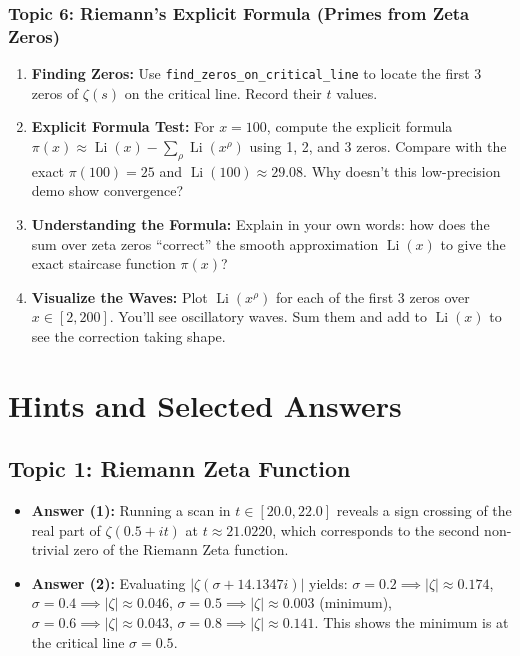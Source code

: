 \documentclass[11pt]{article}
\begin{document}
\subsubsection{Topic 6: Riemann's Explicit Formula (Primes from Zeta Zeros)}
\begin{enumerate}
    \item \textbf{Finding Zeros:} Use \texttt{find\_zeros\_on\_critical\_line} to locate the first 3 zeros of $\zeta(s)$ on the critical line. Record their $t$ values.
    \item \textbf{Explicit Formula Test:} For $x=100$, compute the explicit formula $\pi(x) \approx \operatorname{Li}(x) - \sum_\rho \operatorname{Li}(x^\rho)$ using 1, 2, and 3 zeros. Compare with the exact $\pi(100)=25$ and $\operatorname{Li}(100)\approx 29.08$. Why doesn't this low-precision demo show convergence?
    \item \textbf{Understanding the Formula:} Explain in your own words: how does the sum over zeta zeros ``correct'' the smooth approximation $\operatorname{Li}(x)$ to give the exact staircase function $\pi(x)$?
    \item \textbf{Visualize the Waves:} Plot $\operatorname{Li}(x^\rho)$ for each of the first 3 zeros over $x \in [2, 200]$. You'll see oscillatory waves. Sum them and add to $\operatorname{Li}(x)$ to see the correction taking shape.
\end{enumerate}

\section{Hints and Selected Answers}

\subsection{Topic 1: Riemann Zeta Function}
\begin{itemize}
    \item \textbf{Answer (1):} Running a scan in $t \in [20.0, 22.0]$ reveals a sign crossing of the real part of $\zeta(0.5+it)$ at $t \approx 21.0220$, which corresponds to the second non-trivial zero of the Riemann Zeta function.
    \item \textbf{Answer (2):} Evaluating $|\zeta(\sigma + 14.1347i)|$ yields:
    $\sigma = 0.2 \implies |\zeta| \approx 0.174$,
    $\sigma = 0.4 \implies |\zeta| \approx 0.046$,
    $\sigma = 0.5 \implies |\zeta| \approx 0.003$ (minimum),
    $\sigma = 0.6 \implies |\zeta| \approx 0.043$,
    $\sigma = 0.8 \implies |\zeta| \approx 0.141$.
    This shows the minimum is at the critical line $\sigma = 0.5$.
\end{itemize}
\end{document}
